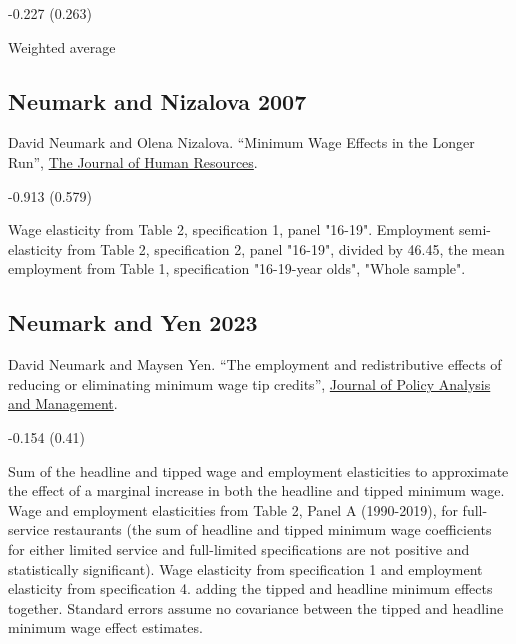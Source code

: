 \vspace{0.7em}

 -0.227 (0.263)

\vspace{0.7em}

 Weighted average

\subsection*{Neumark and Nizalova 2007}
\vspace{-0.7em}

\noindent David Neumark and Olena Nizalova. ``Minimum Wage Effects in the Longer Run'', \href{https://doi.org/10.3368/jhr.XLII.2.435}{The Journal of Human Resources}.

\vspace{0.7em}

 -0.913 (0.579)

\vspace{0.7em}

 Wage elasticity from Table 2, specification 1, panel "16-19". Employment semi-elasticity from Table 2, specification 2, panel "16-19", divided by 46.45, the mean employment from Table 1, specification "16-19-year olds", "Whole sample".

\subsection*{Neumark and Yen 2023}
\vspace{-0.7em}

\noindent David Neumark and Maysen Yen. ``The employment and redistributive effects of reducing or eliminating minimum wage tip credits'', \href{https://doi.org/10.1002/pam.22450}{Journal of Policy Analysis and Management}.

\vspace{0.7em}

 -0.154 (0.41)

\vspace{0.7em}

 Sum of the headline and tipped wage and employment elasticities to approximate the effect of a marginal increase in both the headline and tipped minimum wage. Wage and employment elasticities from Table 2, Panel A (1990-2019), for full-service restaurants (the sum of headline and tipped minimum wage coefficients for either limited service and full-limited specifications are not positive and statistically significant). Wage elasticity from specification 1 and employment elasticity from specification 4. adding the tipped and headline minimum effects together. Standard errors assume no covariance between the tipped and headline minimum wage effect estimates.

